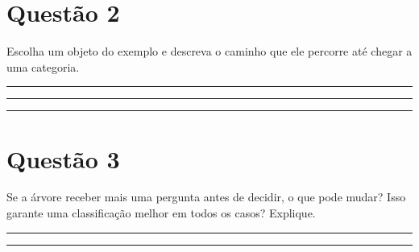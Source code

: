 \documentclass[12pt,a4paper]{article}
\newcommand{\linha}{\rule{\linewidth}{0.35pt}}
\begin{document}
\section*{Questão 2}

Escolha um objeto do exemplo e descreva o caminho que ele percorre até chegar a uma categoria.

\vspace{0.25em}
\linha\par\vspace{0.75em}
\linha\par\vspace{0.75em}
\linha

\section*{Questão 3}

Se a árvore receber mais uma pergunta antes de decidir, o que pode mudar? Isso garante uma classificação melhor em todos os casos? Explique.

\vspace{0.25em}
\linha\par\vspace{0.75em}
\linha
\end{document}
